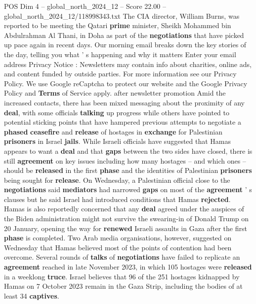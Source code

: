 \begin{textsample}{POS Dim 4 – global\_north\_2024\_12 – Score 22.00 – global\_north\_2024\_12/118998343.txt}
The CIA director, William Burns, was reported to be meeting the Qatari \textbf{prime} minister, Sheikh Mohammed bin Abdulrahman Al Thani, in Doha as part of the \textbf{negotiations} that have picked up pace again in recent days.
Our morning email breaks down the key stories of the day, telling you what ' s happening and why it matters Enter your email address Privacy Notice : Newsletters may contain info about charities, online ads, and content funded by outside parties.
For more information see our Privacy Policy.
We use Google reCaptcha to protect our website and the Google Privacy Policy and \textbf{Terms} of Service apply. after newsletter promotion Amid the increased contacts, there has been mixed messaging about the proximity of any \textbf{deal}, with some officials \textbf{talking} up progress while others have pointed to potential sticking points that have hampered previous attempts to negotiate a \textbf{phased} \textbf{ceasefire} and \textbf{release} of hostages in \textbf{exchange} for Palestinian \textbf{prisoners} in Israel \textbf{jails}.
While Israeli officials have suggested that Hamas appears to want a \textbf{deal} and that \textbf{gaps} between the two sides have closed, there is still \textbf{agreement} on key issues including how many hostages -- and which ones -- should be \textbf{released} in the first \textbf{phase} and the identities of Palestinian \textbf{prisoners} being sought for \textbf{release}.
On Wednesday, a Palestinian official close to the \textbf{negotiations} said \textbf{mediators} had narrowed \textbf{gaps} on most of the \textbf{agreement} ' s clauses but he said Israel had introduced conditions that Hamas \textbf{rejected}.
Hamas is also reportedly concerned that any \textbf{deal} agreed under the auspices of the Biden administration might not survive the swearing-in of Donald Trump on 20 January, opening the way for \textbf{renewed} Israeli assaults in Gaza after the first \textbf{phase} is completed.
Two Arab media organisations, however, suggested on Wednesday that Hamas believed most of the points of contention had been overcome.
Several rounds of \textbf{talks} of \textbf{negotiations} have failed to replicate an \textbf{agreement} reached in late November 2023, in which 105 hostages were \textbf{released} in a weeklong \textbf{truce}.
Israel believes that 96 of the 251 hostages kidnapped by Hamas on 7 October 2023 remain in the Gaza Strip, including the bodies of at least 34 \textbf{captives}.

\end{textsample}
